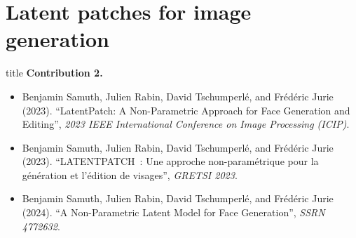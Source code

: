 \documentclass[aspectratio=169, 22pt]{beamer}
\begin{document}
\section{Latent patches for image generation}
\begin{frame}
  \vfill
  \begin{beamercolorbox}[sep=15pt,center,shadow=true,rounded=true]{title}
    \LARGE\bfseries Contribution 2.\\ \secname
  \end{beamercolorbox}
  \vfill
  \begin{itemize}
  \item \footnotesize Benjamin Samuth, Julien Rabin, David Tschumperlé, and
    Frédéric Jurie (2023). ``LatentPatch: A Non-Parametric Approach for
    Face Generation and Editing'', \emph{2023 IEEE International
      Conference on Image Processing (ICIP)}.
  \item \footnotesize Benjamin Samuth, Julien Rabin, David Tschumperlé, and
    Frédéric Jurie (2023). ``LATENTPATCH : Une approche non-paramétrique
    pour la génération et l’édition de visages'', \emph{GRETSI 2023}.
  \item \footnotesize Benjamin Samuth, Julien Rabin, David Tschumperlé, and Frédéric Jurie
    (2024). ``A Non-Parametric Latent Model for Face Generation'', \emph{SSRN 4772632}.
  \end{itemize}
\end{frame}
\end{document}
